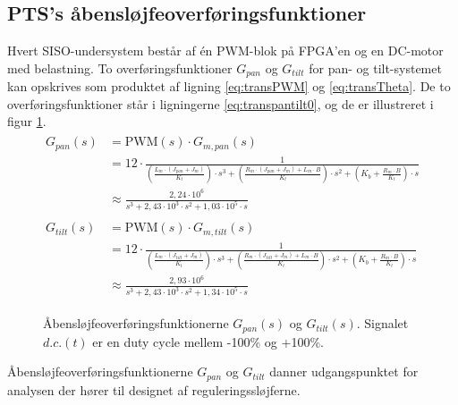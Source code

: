 \subsection{PTS's åbensløjfeoverføringsfunktioner}
Hvert SISO-undersystem består af én PWM-blok på FPGA'en og en DC-motor med belastning.
To overføringsfunktioner \(G_{pan}\) og \(G_{tilt}\) for pan- og tilt-systemet kan opskrives
som produktet af ligning \ref{eq:transPWM} og \ref{eq:transTheta}. De to overføringsfunktioner
står i ligningerne \ref{eq:transpantilt0}, og de er illustreret i figur \ref{fig:openloop1}.
\begin{align}
\label{eq:transpantilt0}
\begin{split}
	G_{pan}\left(s\right)&=\text{PWM}\left(s\right)\cdot{}G_{m,pan}\left(s\right)\\
	&=12\cdot{}\frac{1}
			{\left(\frac{L_m\cdot{}\left(J_{pan}+J_m\right)}{K_t}\right)\cdot{}s^3
			+\left(\frac{R_m\cdot{}\left(J_{pan}+J_m\right)+L_m\cdot{}B}{K_t}\right)\cdot{}s^2
			+\left(K_b+\frac{R_m\cdot{}B}{K_t}\right)\cdot{}s}\\
	&\approx\frac{2,24\cdot{}10^6}{s^3 + 2,43\cdot{}10^3 \cdot{} s^2 + 1,03\cdot{}10^5\cdot{}s}
	\\
	\\
	G_{tilt}\left(s\right)&=\text{PWM}\left(s\right)\cdot{}G_{m,tilt}\left(s\right)\\
	&=12\cdot{}\frac{1}
			{\left(\frac{L_m\cdot{}\left(J_{tilt}+J_m\right)}{K_t}\right)\cdot{}s^3
			+\left(\frac{R_m\cdot{}\left(J_{tilt}+J_m\right)+L_m\cdot{}B}{K_t}\right)\cdot{}s^2
			+\left(K_b+\frac{R_m\cdot{}B}{K_t}\right)\cdot{}s}\\
	&\approx\frac{2,93\cdot{}10^6}{s^3 + 2,43\cdot{}10^3 \cdot{} s^2 + 1,34\cdot{}10^5\cdot{}s}
\end{split}
\end{align}
\begin{figure}[!th]
\centering
\begin{tikzpicture}[auto, node distance=2.6cm,>=latex']

\end{tikzpicture}
\caption[Åbensløjfeoverføringsfunktioner]{Åbensløjfeoverføringsfunktionerne \(G_{pan}\left(s\right)\) og \(G_{tilt}\left(s\right)\).
	Signalet \(d.c.\left(t\right)\) er en duty cycle mellem -100\% og +100\%.}
\label{fig:openloop1}
\end{figure}

Åbensløjfeoverføringsfunktionerne \(G_{pan}\) og \(G_{tilt}\) danner udgangspunktet
for analysen der hører til designet af reguleringssløjferne.


